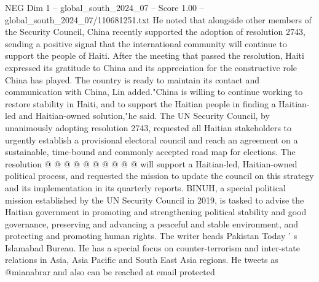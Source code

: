 \begin{textsample}{NEG Dim 1 – global\_south\_2024\_07 – Score 1.00 – global\_south\_2024\_07/110681251.txt}
He noted that alongside other members of the Security Council, China recently supported the adoption of resolution 2743, sending a positive signal that the international community will continue to support the people of Haiti.
After the meeting that passed the resolution, Haiti expressed its gratitude to China and its appreciation for the constructive role China has played.
The country is ready to maintain its contact and communication with China, Lin added."China is willing to continue working to restore stability in Haiti, and to support the Haitian people in finding a Haitian-led and Haitian-owned solution,"he said.
The UN Security Council, by unanimously adopting resolution 2743, requested all Haitian stakeholders to urgently establish a provisional electoral council and reach an agreement on a sustainable, time-bound and commonly accepted road map for elections.
The resolution @ @ @ @ @ @ @ @ @ @ will support a Haitian-led, Haitian-owned political process, and requested the mission to update the council on this strategy and its implementation in its quarterly reports.
BINUH, a special political mission established by the UN Security Council in 2019, is tasked to advise the Haitian government in promoting and strengthening political stability and good governance, preserving and advancing a peaceful and stable environment, and protecting and promoting human rights.
The writer heads Pakistan Today ' s Islamabad Bureau.
He has a special focus on counter-terrorism and inter-state relations in Asia, Asia Pacific and South East Asia regions.
He tweets as @mianabrar and also can be reached at email protected

\end{textsample}
